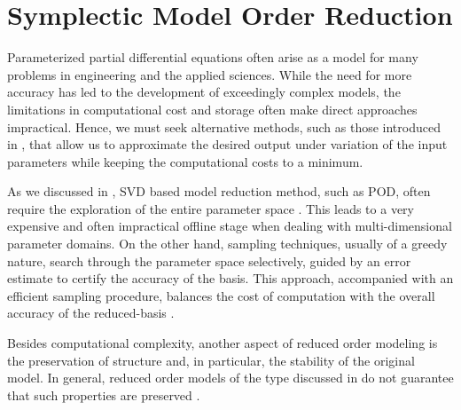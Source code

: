 \chapter{Symplectic Model Order Reduction} \label{chapter:4}

Parameterized partial differential equations often arise as a model for many problems in engineering and the applied sciences. While the need for more accuracy has led to the development of exceedingly complex models, the limitations in computational cost and storage often make direct approaches impractical. Hence, we must seek alternative methods, such as those introduced in , that allow us to approximate the desired output under variation of the input parameters while keeping the computational costs to a minimum.

As we discussed in , SVD based model reduction method, such as POD, often require the exploration of the entire parameter space \cite{doi:10.1137/S0036142900382612,atwell2001proper,doi:10.1137/S1064827500374716,ito1998reduced,ito1998reduced2,ito2001reduced,doi:10.1137/0910047}. This leads to a very expensive and often impractical offline stage when dealing with multi-dimensional parameter domains. On the other hand, sampling techniques, usually of a greedy nature, search through the parameter space selectively, guided by an error estimate to certify the accuracy of the basis. This approach, accompanied with an efficient sampling procedure, balances the cost of computation with the overall accuracy of the reduced-basis \cite{cuong2005certified,rozza2005reduced,hesthaven2015certified}.

Besides computational complexity, another aspect of reduced order modeling is the preservation of structure and, in particular, the stability of the original model. In general, reduced order models of the type discussed in  do not guarantee that such properties are preserved \cite{prajna2003pod}. 

